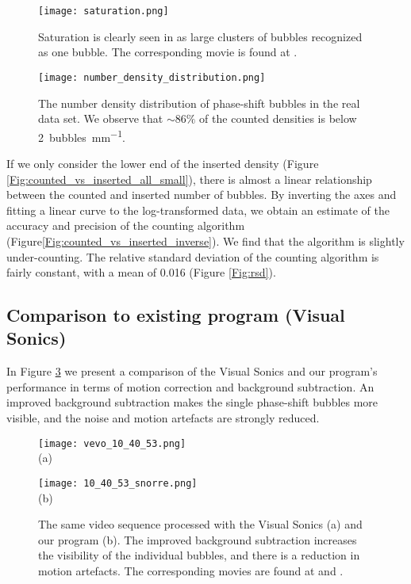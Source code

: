 \begin{figure}[h]
	\centering
	\texttt{[image: saturation.png]}
	 \cprotect\caption{Saturation is clearly seen in as large clusters of bubbles recognized as one bubble. The corresponding movie is found at  .}
	\label{Fig:saturation}
\end{figure}

\begin{figure}[h]
	\centering
	\texttt{[image: number\_density\_distribution.png]}
	\caption{The number density distribution of phase-shift bubbles in the real data set. We observe that $\sim 86\%$ of the counted densities is below \SI{2}{bubbles\per\milli\meter}.}
	\label{Fig:number density distribution}
\end{figure} 


If we only consider the lower end of the inserted density (Figure \ref{Fig:counted_vs_inserted_all_small}), there is almost a linear relationship between the counted and inserted number of bubbles. By inverting the axes and fitting a linear curve to the log-transformed data, we obtain an estimate of the accuracy and precision of the counting algorithm (Figure\ref{Fig:counted_vs_inserted_inverse}). We find that the algorithm is slightly under-counting. The relative standard deviation of the counting algorithm is fairly constant, with a mean of 0.016 (Figure \ref{Fig:rsd}).

\subsection{Comparison to existing program (Visual Sonics)}
In Figure \ref{Fig:compare VisualSonics} we present a comparison of the Visual Sonics and our program's performance in terms of motion correction and background subtraction. An improved background subtraction makes the single phase-shift bubbles more visible, and the noise and motion artefacts are strongly reduced.

\begin{figure}[h]
	\centering
	\begin{minipage}[b]{0.42\textwidth}
		\centering
		\texttt{[image: vevo\_10\_40\_53.png]}\\
		(a)
	\end{minipage}%
	\begin{minipage}[b]{0.35\textwidth}
		\centering
		\texttt{[image: 10\_40\_53\_snorre.png]}\\
		(b)
	\end{minipage}%
	 \cprotect\caption{The same video sequence processed with the Visual Sonics (a) and our program (b). The improved background subtraction increases the visibility of the individual bubbles, and there is a reduction in motion artefacts. The corresponding movies are found at  and .}
	\label{Fig:compare VisualSonics}
\end{figure}

